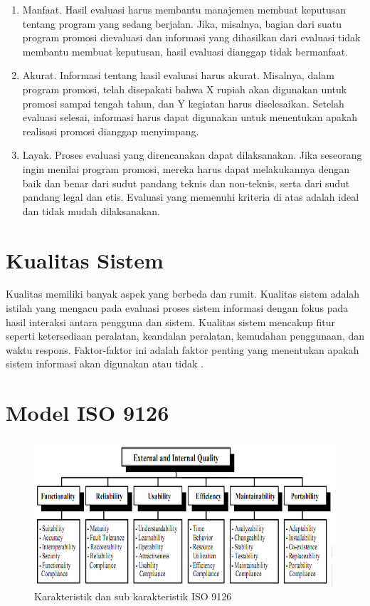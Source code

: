 \begin{enumerate}
	\item Manfaat. Hasil evaluasi harus membantu manajemen membuat keputusan tentang program yang sedang berjalan. Jika, misalnya, bagian dari suatu program promosi dievaluasi dan informasi yang dihasilkan dari evaluasi tidak membantu membuat keputusan, hasil evaluasi dianggap tidak bermanfaat.
	\item Akurat. Informasi tentang hasil evaluasi harus akurat. Misalnya, dalam program promosi, telah disepakati bahwa X rupiah akan digunakan untuk promosi sampai tengah tahun, dan Y kegiatan harus diselesaikan. Setelah evaluasi selesai, informasi harus dapat digunakan untuk menentukan apakah realisasi promosi dianggap menyimpang.
	\item Layak. Proses evaluasi yang direncanakan dapat dilaksanakan. Jika seseorang ingin menilai program promosi, mereka harus dapat melakukannya dengan baik dan benar dari sudut pandang teknis dan non-teknis, serta dari sudut pandang legal dan etis. Evaluasi yang memenuhi kriteria di atas adalah ideal dan tidak mudah dilaksanakan.
\end{enumerate}

\section{Kualitas Sistem}
Kualitas memiliki banyak aspek yang berbeda dan rumit. Kualitas sistem adalah istilah yang mengacu pada evaluasi proses sistem informasi dengan fokus pada hasil interaksi antara pengguna dan sistem. Kualitas sistem mencakup fitur seperti ketersediaan peralatan, keandalan peralatan, kemudahan penggunaan, dan waktu respons. Faktor-faktor ini adalah faktor penting yang menentukan apakah sistem informasi akan digunakan atau tidak \cite{pawirosumarto2016pengaruh}.

\section{Model ISO 9126}

\begin{figure}
  \centering
  \includegraphics[width=0.82\linewidth]{konten//gambar/Model-Iso.png}
  \caption{Karakteristik dan sub karakteristik ISO 9126}
  \label{fig:enter-label}
\end{figure}

